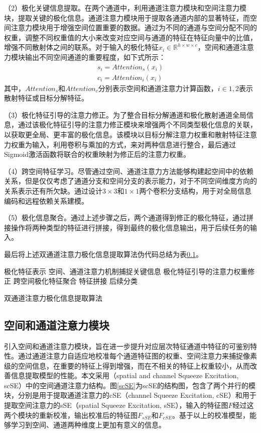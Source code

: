 （2）极化关键信息提取。在两个通道中，利用通道注意力模块和空间注意力模块，提取关键的极化信息。通道注意力模块用于提取各通道内部的显著特征，而空间注意力模块用于增强空间位置重要的数据。通过为不同的通道与空间分配不同的权重，调整不同权重值的大小来改变对应空间与通道的特征在特征向量中的比值，增强不同散射体之间的联系。对于输入的极化特征$x_i \in \mathbb{R}^{h \times w \times c}$，空间和通道注意力模块输出不同空间通道的重要程度，如下式所示：
\begin{align}
    s_i=Attention_s\left( x_i \right)
    \\
    c_i=Attention_i\left( x_i \right)
\end{align}
其中，$Attention_s$和$Attention_c$分别表示空间和通道注意力计算函数，$i \in {1,2}$表示散射特征或目标分解特征。

（3）极化特征引导的注意力修正。为了整合目标分解通道和极化散射通道全局信息，通过该极化特征引导的注意力修正模块来增强两个不同类型极化信息的关联，以获取更全局、更丰富的极化信息。该模块以目标分解注意力权重和散射特征注意力权重为输入，利用卷积与乘加的方式，来对两种信息进行整合，最后通过Sigmoid激活函数将联合的权重映射为修正后的注意力权重。

（4）跨空间特征学习。尽管通过空间、通道注意力方法能够构建起空间中的依赖关系，但是仅仅考虑了通道分支和空间分支的表示能力，对于不同空间维度方向的关系表示还有所欠缺。通过设计$3\times 3$和$1 \times 1$两个卷积分支结构，用于对全局信息编码和远程依赖关系建模。

（5）极化信息聚合。通过上述步骤之后，两个通道得到修正的极化特征，通过拼接操作将两种类型的特征进行拼接，得到最终的极化信息输出，用于后续任务的输入。

最后将上述双通道注意力极化信息提取算法伪代码总结为表\ref{}。

\begin{algorithm}[H]
    极化特征表示\;
    空间、通道注意力机制捕捉关键信息\;
    极化特征引导的注意力权重修正\;
    跨空间极化特征聚合\;
    特征拼接\;
    后续分类\;
    \caption{双通道注意力极化信息提取算法}
\end{algorithm}


\subsection{空间和通道注意力模块}
引入空间和通道注意力模块，旨在进一步提升对应层次特征通道中特征的可鉴别特性。通过通道注意力自适应地校准每个通道特征图的权重、空间注意力来捕捉像素级的空间信息，在重要的特征上得到增强，而在不相关的特征上权重较小，从而改善信息提取模型的性能。本文采用（spatial and channel Squeeze Excitation, scSE）\citing{}中的空间通道注意力结构。图\ref{scSE}为scSE的结构图，包含了两个并行的模块，分别是用于提取通道注意力的cSE（channel Squeeze Excitation, cSE）和用于提取空间注意力的sSE（spatial Squeeze Excitation, sSE），输入的特征图$F$经过这两个模块的重新校准，输出校准后的特征图$F_{sSE}$和$F_{cSE}$。基于以上的校准模型，能够学习到空间、通道两种维度上更加有意义的信息。

